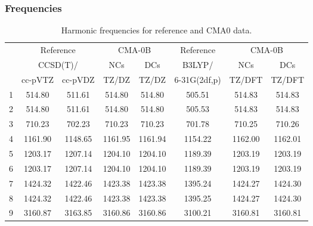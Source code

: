 \documentclass[10pt,oneside]{article}
\begin{document}
\subsubsection*{Frequencies}
\begin{table}[h!]
\centering
\caption{Harmonic frequencies for reference and CMA0 data.}
\begin{tabular}{cccccccc}
\toprule
{} & \multicolumn{2}{c}{Reference} & \multicolumn{2}{c}{CMA-0B} &    Reference & \multicolumn{2}{c}{CMA-0B} \\
{} & \multicolumn{2}{c}{CCSD(T)/} &     NCs &     DCs &       B3LYP/ &     NCs &     DCs \\
{} &   cc-pVTZ & cc-pVDZ &   TZ/DZ &   TZ/DZ & 6-31G(2df,p) &  TZ/DFT &  TZ/DFT \\
\midrule
1 &    514.80 &  511.61 &  514.80 &  514.80 &       505.51 &  514.83 &  514.83 \\
2 &    514.80 &  511.61 &  514.80 &  514.80 &       505.53 &  514.83 &  514.83 \\
3 &    710.23 &  702.23 &  710.23 &  710.23 &       701.78 &  710.25 &  710.26 \\
4 &   1161.90 & 1148.65 & 1161.95 & 1161.94 &      1154.22 & 1162.00 & 1162.01 \\
5 &   1203.17 & 1207.14 & 1204.10 & 1204.10 &      1189.39 & 1203.19 & 1203.19 \\
6 &   1203.17 & 1207.14 & 1204.10 & 1204.10 &      1189.39 & 1203.19 & 1203.19 \\
7 &   1424.32 & 1422.46 & 1423.38 & 1423.38 &      1395.24 & 1424.27 & 1424.30 \\
8 &   1424.32 & 1422.46 & 1423.38 & 1423.38 &      1395.25 & 1424.27 & 1424.30 \\
9 &   3160.87 & 3163.85 & 3160.86 & 3160.86 &      3100.21 & 3160.81 & 3160.81 \\
\bottomrule
\end{tabular}
\end{table}

\clearpage
\end{document}
